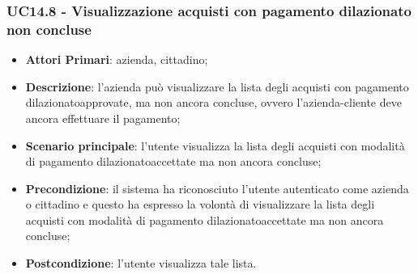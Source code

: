\subsubsection{UC14.8 - Visualizzazione acquisti con pagamento dilazionato non concluse}
\begin{itemize}
	\item \textbf{Attori Primari}: azienda, cittadino;
	\item \textbf{Descrizione}: l'azienda può visualizzare la lista degli acquisti con pagamento dilazionato\glosp approvate, ma non ancora concluse, ovvero l'azienda-cliente deve ancora effettuare il pagamento;
	\item \textbf{Scenario principale}: l'utente visualizza la lista degli acquisti con modalità di pagamento dilazionato\glosp accettate ma non ancora concluse;
	\item \textbf{Precondizione}: il sistema ha riconosciuto l'utente autenticato come azienda o cittadino e questo ha espresso la volontà di visualizzare la lista degli acquisti con modalità di pagamento dilazionato\glosp accettate ma non ancora concluse;
	\item \textbf{Postcondizione}: l'utente visualizza tale lista.
\end{itemize}
